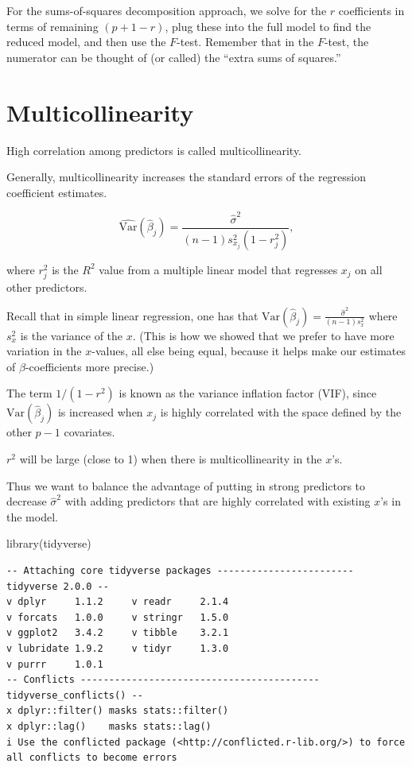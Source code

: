 \documentclass[
  letterpaper,
  DIV=11,
  numbers=noendperiod]{scrreport}
\newenvironment{Shaded}{\begin{snugshade}}{\end{snugshade}}
\newcommand{\FunctionTok}[1]{\textcolor[rgb]{0.28,0.35,0.67}{#1}}
\newcommand{\NormalTok}[1]{\textcolor[rgb]{0.00,0.23,0.31}{#1}}
\begin{document}
For the sums-of-squares decomposition approach, we solve for the \(r\)
coefficients in terms of remaining \((p+1-r)\), plug these into the full
model to find the reduced model, and then use the \(F\)-test. Remember
that in the \(F\)-test, the numerator can be thought of (or called) the
``extra sums of squares.''

\hypertarget{multicollinearity}{%
\section{Multicollinearity}\label{multicollinearity}}

High correlation among predictors is called {multicollinearity}.

Generally, multicollinearity increases the standard errors of the
regression coefficient estimates.

\[\widehat{\text{Var}}(\hat \beta_j) = \frac{\hat \sigma^2}{(n-1)s_{x_j}^2 (1-r^2_j)},\]

where \(r^2_j\) is the \(R^2\) value from a multiple linear model that
regresses \(x_j\) on all other predictors.

Recall that in simple linear regression, one has that
\(\text{Var}(\hat \beta_j) = \frac{\hat \sigma^2}{(n-1)s_x^2}\) where
\(s_x^2\) is the variance of the \(x\). (This is how we showed that we
prefer to have more variation in the \(x\)-values, all else being equal,
because it helps make our estimates of \(\beta\)-coefficients more
precise.)

The term \(1/(1-r^2)\) is known as the {variance inflation factor}
(VIF), since \(\text{Var}(\hat \beta_j)\) is increased when \(x_j\) is
highly correlated with the space defined by the other \(p-1\)
covariates.

\(r^2\) will be large (close to 1) when there is multicollinearity in
the \(x\)'s.

Thus we want to balance the advantage of putting in strong predictors to
decrease \(\hat \sigma^2\) with adding predictors that are highly
correlated with existing \(x\)'s in the model.

\begin{Shaded}
\begin{Highlighting}[]
\FunctionTok{library}\NormalTok{(tidyverse)}
\end{Highlighting}
\end{Shaded}

\begin{verbatim}
-- Attaching core tidyverse packages ------------------------ tidyverse 2.0.0 --
v dplyr     1.1.2     v readr     2.1.4
v forcats   1.0.0     v stringr   1.5.0
v ggplot2   3.4.2     v tibble    3.2.1
v lubridate 1.9.2     v tidyr     1.3.0
v purrr     1.0.1     
-- Conflicts ------------------------------------------ tidyverse_conflicts() --
x dplyr::filter() masks stats::filter()
x dplyr::lag()    masks stats::lag()
i Use the conflicted package (<http://conflicted.r-lib.org/>) to force all conflicts to become errors
\end{verbatim}
\end{document}
